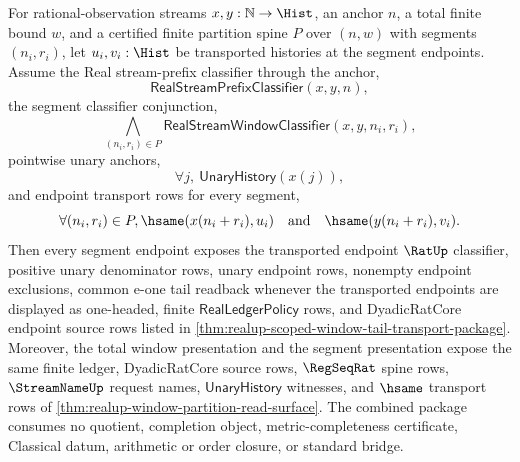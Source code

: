 \begin{theorem}
\label{thm:realup-partitioned-window-tail-transport-package}
For rational-observation streams $x,y:\mathbb{N}\to\Hist$, an anchor $n$, a
total finite bound $w$, and a certified finite partition spine $P$ over $(n,w)$
with segments $(n_i,r_i)$, let $u_i,v_i:\Hist$ be transported histories at the
segment endpoints. Assume the Real stream-prefix classifier through the anchor,
$$
\mathsf{RealStreamPrefixClassifier}(x,y,n),
$$
the segment classifier conjunction,
$$
\bigwedge_{(n_i,r_i)\in P}
\mathsf{RealStreamWindowClassifier}(x,y,n_i,r_i),
$$
pointwise unary anchors,
$$
\forall j,\ \mathsf{UnaryHistory}(x(j)),
$$
and endpoint transport rows for every segment,
$$
\forall (n_i,r_i)\in P,
\hsame(x(n_i+r_i),u_i)\quad\text{and}\quad \hsame(y(n_i+r_i),v_i).
$$
Then every segment endpoint exposes the transported endpoint $\RatUp$
classifier, positive unary denominator rows, unary endpoint rows, nonempty
endpoint exclusions, common e-one tail readback whenever the transported
endpoints are displayed as one-headed, finite $\mathsf{RealLedgerPolicy}$ rows,
and DyadicRatCore endpoint source rows listed in
\autoref{thm:realup-scoped-window-tail-transport-package}. Moreover, the total
window presentation and the segment presentation expose the same finite ledger,
DyadicRatCore source rows, $\RegSeqRat$ spine rows, $\StreamNameUp$ request
names, $\mathsf{UnaryHistory}$ witnesses, and $\hsame$ transport rows of
\autoref{thm:realup-window-partition-read-surface}. The combined package
consumes no quotient, completion object, metric-completeness certificate,
Classical datum, arithmetic or order closure, or standard bridge.
\end{theorem}
